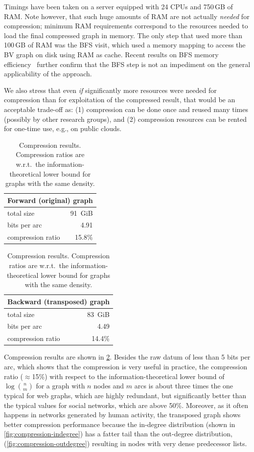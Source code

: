 Timings have been taken on a server equipped with 24 CPUs and 750\,GB of
RAM\@. Note however, that such huge amounts of RAM are not actually \emph{needed}
for compression; minimum RAM requirements correspond to the resources needed to
load the final compressed graph in memory. The only step that used more than
100\,GB of RAM was the BFS visit, which used a memory mapping to access the BV
graph on disk using RAM as cache. Recent results on BFS memory
efficiency~\cite{hagerup2019bfs} further confirm that the BFS step is not an
impediment on the general applicability of the approach.

We also stress that even \emph{if} significantly more resources were needed for
compression than for exploitation of the compressed result, that would be an
acceptable trade-off as: (1) compression can be done once and reused many times
(possibly by other research groups), and (2) compression resources can be
rented for one-time use, e.g., on public clouds.

\smallskip

\begin{table}
  \centering
  \caption{Compression results. Compression ratios are w.r.t.~the
    information-theoretical lower bound for graphs with the same density.}%
  \label{tab:compression-bfs-results}

  \hfill
  \begin{tabular}{lr}
    \multicolumn{2}{c}{\textbf{Forward (original) graph}} \\
    \hline\hline
    total size         & 91~GiB \\
    bits per arc       & 4.91 \\
    compression ratio  & 15.8\% \\
    \hline
  \end{tabular}
  \hfill
  \begin{tabular}{lr}
    \multicolumn{2}{c}{\textbf{Backward (transposed) graph}} \\
    \hline\hline
    total size         & 83~GiB \\
    bits per arc       & 4.49  \\
    compression ratio  & 14.4\% \\
    \hline
  \end{tabular}
  \hfill
\end{table}

Compression results are shown in \cref{tab:compression-bfs-results}.
Besides the raw datum of less than 5 bits per arc, which shows that the
compression is very useful in practice, the compression ratio ($\approx$15\%)
with respect to the information-theoretical lower bound of $\log {n\choose m}$
for a graph with $n$ nodes and $m$ arcs is about three times the one typical
for web graphs, which are highly redundant, but significantly better than the
typical values for social networks, which are above 50\%. Moreover, as it often
happens in networks generated by human activity, the transposed graph shows
better compression performance because the in-degree distribution (shown in
\cref{fig:compression-indegree}) has a fatter tail than the out-degree
distribution, (\cref{fig:compression-outdegree}) resulting in nodes with very
dense predecessor lists.

